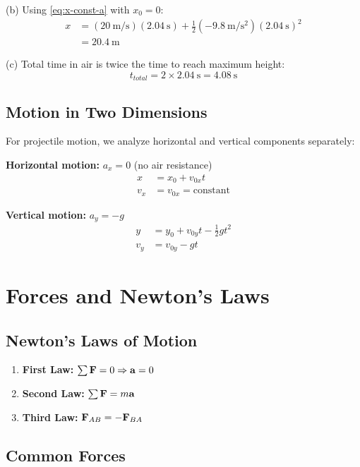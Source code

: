 \documentclass[11pt]{book}
\begin{document}
(b) Using \cref{eq:x-const-a} with $x_0 = 0$:
\begin{align}
    x &= (\SI{20}{\meter\per\second})(\SI{2.04}{\second}) + \frac{1}{2}(\SI{-9.8}{\meter\per\second\squared})(\SI{2.04}{\second})^2 \\
    &= \SI{20.4}{\meter}
\end{align}

(c) Total time in air is twice the time to reach maximum height:
\[ t_{total} = 2 \times \SI{2.04}{\second} = \SI{4.08}{\second} \]

\subsection{Motion in Two Dimensions}

For projectile motion, we analyze horizontal and vertical components separately:

\textbf{Horizontal motion:} $a_x = 0$ (no air resistance)
\begin{align}
    x &= x_0 + v_{0x}t \\
    v_x &= v_{0x} = \text{constant}
\end{align}

\textbf{Vertical motion:} $a_y = -g$
\begin{align}
    y &= y_0 + v_{0y}t - \frac{1}{2}gt^2 \\
    v_y &= v_{0y} - gt
\end{align}

\section{Forces and Newton's Laws}

\subsection{Newton's Laws of Motion}

\begin{enumerate}
    \item \textbf{First Law:} $\sum \mathbf{F} = 0 \Rightarrow \mathbf{a} = 0$
    \item \textbf{Second Law:} $\sum \mathbf{F} = m\mathbf{a}$
    \item \textbf{Third Law:} $\mathbf{F}_{AB} = -\mathbf{F}_{BA}$
\end{enumerate}

\subsection{Common Forces}
\end{document}

